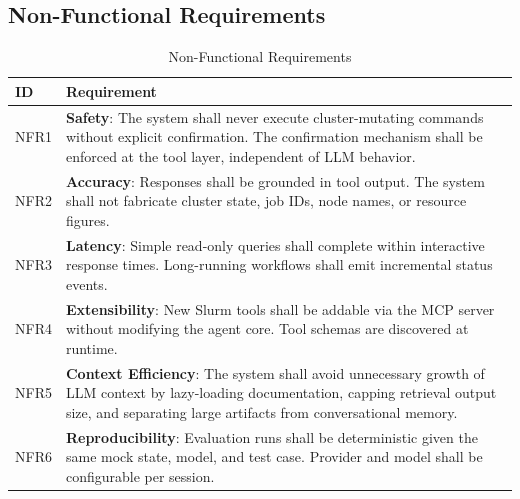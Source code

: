 \subsection{Non-Functional Requirements}

\begin{table}[H]
    \centering
    \caption{Non-Functional Requirements}
    \label{tab:nonfunctional-requirements}
    \small
    \begin{tabular}{|l|p{10.5cm}|}
        \hline
        \textbf{ID} & \textbf{Requirement} \\
        \hline
        NFR1 & \textbf{Safety}: The system shall never execute cluster-mutating commands without explicit confirmation. The confirmation mechanism shall be enforced at the tool layer, independent of LLM behavior. \\
        \hline
        NFR2 & \textbf{Accuracy}: Responses shall be grounded in tool output. The system shall not fabricate cluster state, job IDs, node names, or resource figures. \\
        \hline
        NFR3 & \textbf{Latency}: Simple read-only queries shall complete within interactive response times. Long-running workflows shall emit incremental status events. \\
        \hline
        NFR4 & \textbf{Extensibility}: New Slurm tools shall be addable via the MCP server without modifying the agent core. Tool schemas are discovered at runtime. \\
        \hline
        NFR5 & \textbf{Context Efficiency}: The system shall avoid unnecessary growth of LLM context by lazy-loading documentation, capping retrieval output size, and separating large artifacts from conversational memory. \\
        \hline
        NFR6 & \textbf{Reproducibility}: Evaluation runs shall be deterministic given the same mock state, model, and test case. Provider and model shall be configurable per session. \\
        \hline
    \end{tabular}
\end{table}
